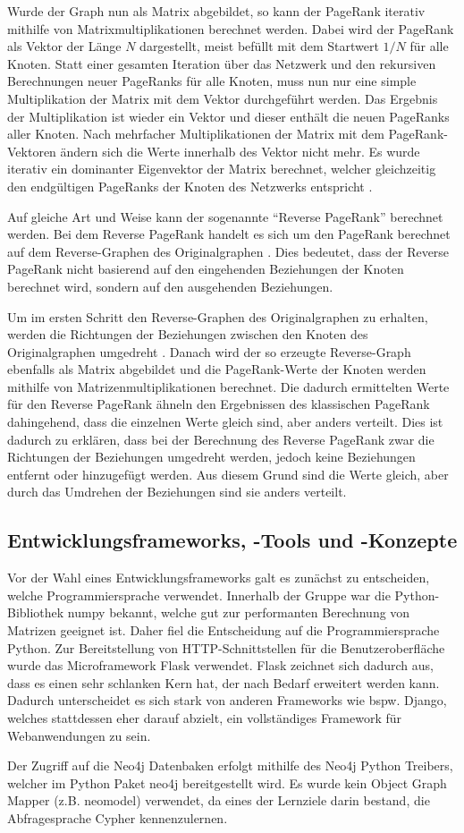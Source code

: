 Wurde der Graph nun als Matrix abgebildet, so kann der PageRank iterativ mithilfe von Matrixmultiplikationen berechnet werden. Dabei wird der PageRank als Vektor der Länge $N$ dargestellt, meist befüllt mit dem Startwert $1/N$ für alle Knoten. Statt einer gesamten Iteration über das Netzwerk und den rekursiven Berechnungen neuer PageRanks für alle Knoten, muss nun nur eine simple Multiplikation der Matrix mit dem Vektor durchgeführt werden. Das Ergebnis der Multiplikation ist wieder ein Vektor und dieser enthält die neuen PageRanks aller Knoten. Nach mehrfacher Multiplikationen der Matrix mit dem PageRank-Vektoren ändern sich die Werte innerhalb des Vektor nicht mehr. Es wurde iterativ ein dominanter Eigenvektor der Matrix berechnet, welcher gleichzeitig den endgültigen PageRanks der Knoten des Netzwerks entspricht \cite{pagerank_eigenvector}. 

Auf gleiche Art und Weise kann der sogenannte ``Reverse PageRank'' berechnet werden. Bei dem Reverse PageRank handelt es sich um den PageRank berechnet auf dem Reverse-Graphen des Originalgraphen \cite{reverse_pagerank}. Dies bedeutet, dass der Reverse PageRank nicht basierend auf den eingehenden Beziehungen der Knoten berechnet wird, sondern auf den ausgehenden Beziehungen. 

Um im ersten Schritt den Reverse-Graphen des Originalgraphen zu erhalten, werden die Richtungen der Beziehungen zwischen den Knoten des Originalgraphen umgedreht \cite{reverse_pagerank}. Danach wird der so erzeugte Reverse-Graph ebenfalls als Matrix abgebildet und die PageRank-Werte der Knoten werden mithilfe von Matrizenmultiplikationen berechnet. Die dadurch ermittelten Werte für den Reverse PageRank ähneln den Ergebnissen des klassischen PageRank dahingehend, dass die einzelnen Werte gleich sind, aber anders verteilt. Dies ist dadurch zu erklären, dass bei der Berechnung des Reverse PageRank zwar die Richtungen der Beziehungen umgedreht werden, jedoch keine Beziehungen entfernt oder hinzugefügt werden. Aus diesem Grund sind die Werte gleich, aber durch das Umdrehen der Beziehungen sind sie anders verteilt.

\subsection{Entwicklungsframeworks, -Tools und -Konzepte}

Vor der Wahl eines Entwicklungsframeworks galt es zunächst zu entscheiden, welche Programmiersprache verwendet. Innerhalb der Gruppe war die Python-Bibliothek numpy bekannt, welche gut zur performanten Berechnung von Matrizen geeignet ist.
Daher fiel die Entscheidung auf die Programmiersprache Python. Zur Bereitstellung von HTTP-Schnittstellen für die Benutzeroberfläche wurde das Microframework Flask verwendet.
Flask zeichnet sich dadurch aus, dass es einen sehr schlanken Kern hat, der nach Bedarf erweitert werden kann. Dadurch unterscheidet es sich stark von anderen Frameworks wie bspw. Django, welches stattdessen eher darauf abzielt, ein vollständiges Framework für Webanwendungen zu sein.

Der Zugriff auf die Neo4j Datenbaken erfolgt mithilfe des Neo4j Python Treibers, welcher im Python Paket neo4j bereitgestellt wird. Es wurde kein Object Graph Mapper (z.B. neomodel) verwendet, da eines der Lernziele darin bestand, die Abfragesprache Cypher kennenzulernen.



